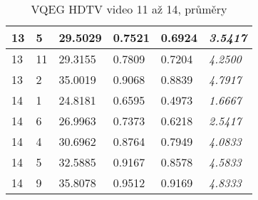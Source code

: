 \documentclass[thesis=M,czech]{FITthesis}[2016/06/26]
\begin{document}
\begin{table}[]
\begin{tabular}{|p{1cm}|p{1cm}|p{1.3cm}|p{1.3cm}|p{1.5cm}|p{1.8cm}|}
13        & 5     & 29.5029       & 0.7521        & 0.6924           &  \textit{3.5417}      \\ \hline
13        & 11    & 29.3155       & 0.7809        & 0.7204           &  \textit{4.2500}      \\ \hline
13        & 2     & 35.0019       & 0.9068        & 0.8839           &  \textit{4.7917}      \\ \hline
14        & 1     & 24.8181       & 0.6595        & 0.4973           &  \textit{1.6667}      \\ \hline
14        & 6     & 26.9963       & 0.7373        & 0.6218           &  \textit{2.5417}      \\ \hline
14        & 4     & 30.6962       & 0.8764        & 0.7949           &  \textit{4.0833}      \\ \hline
14        & 5     & 32.5885       & 0.9167        & 0.8578           &  \textit{4.5833}      \\ \hline
14        & 9     & 35.8078       & 0.9512        & 0.9169           &  \textit{4.8333}      \\ \hline
\end{tabular}
\caption{VQEG HDTV video 11 až 14, průměry} \label{tab:VQEGHD1_11-14_avg}
\end{table}
\end{document}
